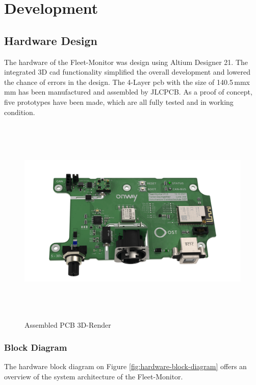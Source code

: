 \chapter{Development}

\section{Hardware Design}
The hardware of the Fleet-Monitor was design using Altium Designer 21. The integrated 3D \acrshort{cad} functionality simplified the overall development and lowered the chance of errors in the design. The 4-Layer \acrfull{pcb} with the size of 140.5\,mm\;x\,mm has been manufactured and assembled by JLCPCB.\newline
As a proof of concept, five prototypes have been made, which are all fully tested and in working condition.

\begin{figure}[h!]
	\hfuzz=57.0pt
	\hspace{-1.4cm}
	\includegraphics[height=10.0cm]{images/fleet-monitor-rendering-pcb}
	\caption{Assembled PCB 3D-Render}
	\label{fig:fleet-monitor-rendering-pcb}
\end{figure}
\newpage

\subsection{Block Diagram}
The hardware block diagram on Figure \ref{fig:hardware-block-diagram} offers an overview of the system architecture of the Fleet-Monitor.

